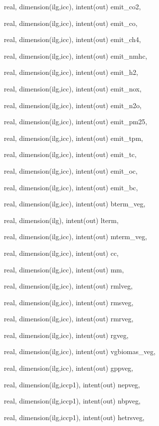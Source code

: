 {\begin{DoxyParamCaption}
\item[{real, dimension(ilg,icc), intent(out)}]{emit\+\_\+co2, }
\item[{real, dimension(ilg,icc), intent(out)}]{emit\+\_\+co, }
\item[{real, dimension(ilg,icc), intent(out)}]{emit\+\_\+ch4, }
\item[{real, dimension(ilg,icc), intent(out)}]{emit\+\_\+nmhc, }
\item[{real, dimension(ilg,icc), intent(out)}]{emit\+\_\+h2, }
\item[{real, dimension(ilg,icc), intent(out)}]{emit\+\_\+nox, }
\item[{real, dimension(ilg,icc), intent(out)}]{emit\+\_\+n2o, }
\item[{real, dimension(ilg,icc), intent(out)}]{emit\+\_\+pm25, }
\item[{real, dimension(ilg,icc), intent(out)}]{emit\+\_\+tpm, }
\item[{real, dimension(ilg,icc), intent(out)}]{emit\+\_\+tc, }
\item[{real, dimension(ilg,icc), intent(out)}]{emit\+\_\+oc, }
\item[{real, dimension(ilg,icc), intent(out)}]{emit\+\_\+bc, }
\item[{real, dimension(ilg,icc), intent(out)}]{bterm\+\_\+veg, }
\item[{real, dimension(ilg), intent(out)}]{lterm, }
\item[{real, dimension(ilg,icc), intent(out)}]{mterm\+\_\+veg, }
\item[{real, dimension(ilg,icc), intent(out)}]{cc, }
\item[{real, dimension(ilg,icc), intent(out)}]{mm, }
\item[{real, dimension(ilg,icc), intent(out)}]{rmlveg, }
\item[{real, dimension(ilg,icc), intent(out)}]{rmsveg, }
\item[{real, dimension(ilg,icc), intent(out)}]{rmrveg, }
\item[{real, dimension(ilg,icc), intent(out)}]{rgveg, }
\item[{real, dimension(ilg,icc), intent(out)}]{vgbiomas\+\_\+veg, }
\item[{real, dimension(ilg,icc), intent(out)}]{gppveg, }
\item[{real, dimension(ilg,iccp1), intent(out)}]{nepveg, }
\item[{real, dimension(ilg,iccp1), intent(out)}]{nbpveg, }
\item[{real, dimension(ilg,iccp1), intent(out)}]{hetrsveg, }

\end{DoxyParamCaption}}
